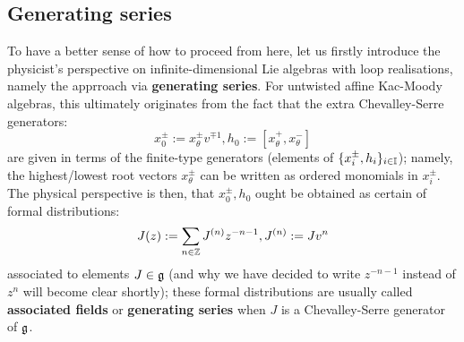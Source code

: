     \subsection{Generating series}
        To have a better sense of how to proceed from here, let us firstly introduce the physicist's perspective on infinite-dimensional Lie algebras with loop realisations, namely the apprroach via \textbf{generating series}. For untwisted affine Kac-Moody algebras, this ultimately originates from the fact that the extra  Chevalley-Serre generators:
            $$x_0^{\pm} := x_{\theta}^{\pm} v^{\mp 1}, h_0 := [x_{\theta}^+, x_{\theta}^-]$$
        are given in terms of the finite-type generators (elements of $\{x_i^{\pm}, h_i\}_{i \in \mathbb{I}}$); namely, the highest/lowest root vectors $x_{\theta}^{\pm}$ can be written as ordered monomials in $x_i^{\pm}$. The physical perspective is then, that $x_0^{\pm}, h_0$ ought be obtained as certain  of formal distributions:
            $$J(z) := \sum_{n \in \mathbb{Z}} J^{(n)} z^{-n - 1}, J^{(n)} := J v^n$$
        associated to elements $J \in \mathfrak{g}$ (and why we have decided to write $z^{-n - 1}$ instead of $z^n$ will become clear shortly); these formal distributions are usually called \textbf{associated fields} or \textbf{generating series} when $J$ is a Chevalley-Serre generator of $\mathfrak{g}$.

